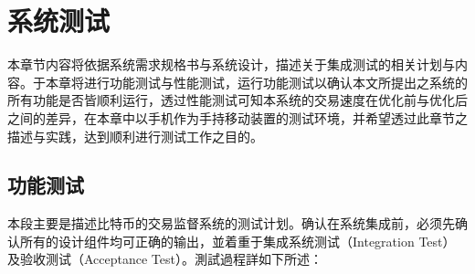 \chapter{系统测试}
本章节内容将依据系统需求规格书与系统设计，描述关于集成测试的相关计划与内容。于本章将进⾏功能测试与性能测试，运⾏功能测试以确认本⽂所提出之系统的所有功能是否皆顺利运⾏，透过性能测试可知本系统的交易速度在优化前与优化后之间的差异，在本章中以⼿机作为⼿持移动装置的测试环境，并希望透过此章节之描述与实践，达到顺利进⾏测试⼯作之⽬的。
	\section{功能测试}
	 	本段主要是描述⽐特币的交易监督系统的测试计划。确认在系统集成前，必须先确认所有的设计组件均可正确的输出，並着重于集成系统测试（Integration Test）及验收测试（Acceptance Test）。測試過程詳如下所述：
